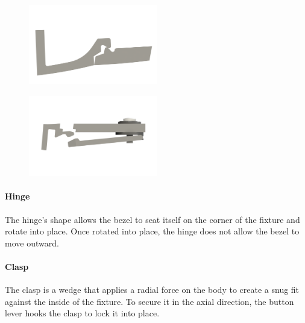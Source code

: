 \documentclass[12pt, landscape]{article}
\begin{document}
	\begin{multicols}{2}

		\begin{figure}[H]
			\centering
			\includegraphics[width=0.5\textwidth]{media/hinge}
			\label{hinge}
		\end{figure}

	\columnbreak

		\begin{figure}[H]
			\centering
			\includegraphics[width=0.5\textwidth]{media/clasp_open}
			\label{clasp_open}
		\end{figure}

	\end{multicols}

	\begin{multicols}{2}

	\paragraph{Hinge}
		The hinge's shape allows the bezel to seat itself on the corner of the fixture and rotate into place.  Once rotated into place, the hinge does not allow the bezel to move outward.

	\columnbreak

	\paragraph{Clasp}
		The clasp is a wedge that applies a radial force on the body to create a snug fit against the inside of the fixture.  To secure it in the axial direction, the button lever hooks the clasp to lock it into place.
	
	\end{multicols}
\end{document}
